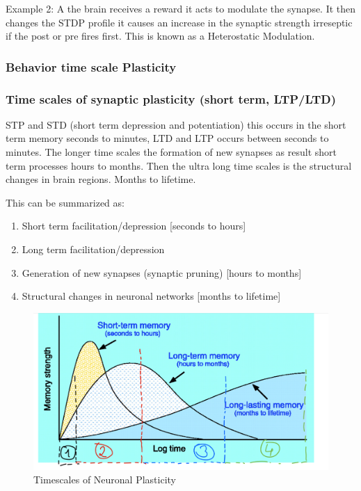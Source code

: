 \documentclass[main]{subfiles}
\begin{document}
Example 2: A the brain receives a reward it acts to modulate the synapse. It then changes the STDP profile it causes an increase in the synaptic strength irreseptic if the post or pre fires first. This is known as a Heterostatic Modulation.


\subsubsection{Behavior time scale Plasticity}




\subsubsection{Time scales of synaptic plasticity (short term, LTP/LTD)}
STP and STD (short term depression and potentiation) this occurs in the short term memory seconds to minutes, LTD and LTP occurs between seconds to minutes. 
The longer time scales the formation of new synapses as result short term processes hours to months. 
Then the ultra long time scales is the structural changes in brain regions. Months to lifetime.

This can be summarized as:
\begin{enumerate}
    \item Short term facilitation/depression [seconds to hours]
    \item Long term facilitation/depression
    \item Generation of new synapses (synaptic pruning) [hours to months]
    \item Structural changes in neuronal networks [months to lifetime]
\end{enumerate}



\begin{figure}[H]
    \centering
    \includegraphics[width=.8\textwidth]{03_PlasticityInTheBrain/figures/timescale_plasticity.png}
    \caption{Timescales of Neuronal Plasticity}
    \label{fig:timescales}
\end{figure}
\end{document}
